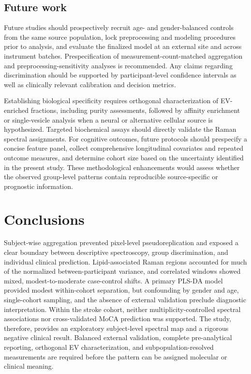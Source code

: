 \documentclass[preprint,12pt]{elsarticle}
\begin{document}
\subsection{Future work} 
\label{subsec:future_work}

Future studies should prospectively recruit age- and gender-balanced controls from the same source population, lock preprocessing and modeling procedures prior to analysis, and evaluate the finalized model at an external site and across instrument batches. Prespecification of measurement-count-matched aggregation and preprocessing-sensitivity analyses is recommended. Any claims regarding discrimination should be supported by participant-level confidence intervals as well as clinically relevant calibration and decision metrics.

Establishing biological specificity requires orthogonal characterization of EV-enriched fractions, including purity assessments, followed by affinity enrichment or single-vesicle analysis when a neural or alternative cellular source is hypothesized. Targeted biochemical assays should directly validate the Raman spectral assignments. For cognitive outcomes, future protocols should prespecify a concise feature panel, collect comprehensive longitudinal covariates and repeated outcome measures, and determine cohort size based on the uncertainty identified in the present study. These methodological enhancements would assess whether the observed group-level patterns contain reproducible source-specific or prognostic information.

\section{Conclusions} 
\label{sec:conclusions}

Subject-wise aggregation prevented pixel-level pseudoreplication and exposed a clear boundary between descriptive spectroscopy, group discrimination, and individual clinical prediction. Lipid-associated Raman regions accounted for much of the normalized between-participant variance, and correlated windows showed mixed, modest-to-moderate case-control shifts. A primary PLS-DA model provided modest within-cohort separation, but confounding by gender and age, single-cohort sampling, and the absence of external validation preclude diagnostic interpretation. Within the stroke cohort, neither multiplicity-controlled spectral associations nor cross-validated MoCA prediction was supported. The study, therefore, provides an exploratory subject-level spectral map and a rigorous negative clinical result. Balanced external validation, complete pre-analytical reporting, orthogonal EV characterization, and subpopulation-resolved measurements are required before the pattern can be assigned molecular or clinical meaning.
\end{document}
